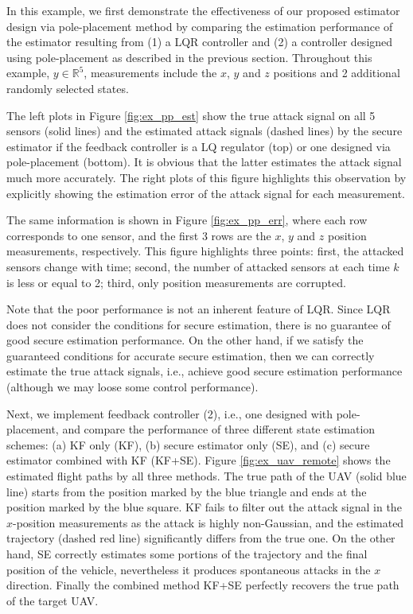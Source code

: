\documentclass[../../thesis.tex]{subfiles}
\begin{document}
In this example, we first demonstrate the effectiveness of our proposed estimator design via pole-placement method by comparing the estimation performance of the estimator resulting from (1) a LQR controller and (2) a controller designed using pole-placement as described in the previous section.
Throughout this example, $y \in \mathbb{R}^5$, measurements include the $x$, $y$ and $z$ positions and 2 additional randomly selected states. 

The left plots in Figure \ref{fig:ex_pp_est} show the true attack signal on all 5 sensors (solid lines) and the estimated attack signals (dashed lines) by the secure estimator if the feedback controller is a LQ regulator (top) or one designed via pole-placement (bottom). It is obvious that the latter estimates the attack signal much more accurately. The right plots of this figure highlights this observation by explicitly showing the estimation error of the attack signal for each measurement.

The same information is shown in Figure \ref{fig:ex_pp_err}, where each row corresponds to one sensor, and the first 3 rows are the $x$, $y$ and $z$ position measurements, respectively. This figure highlights three points: first, the attacked sensors change with time; second, the number of attacked sensors at each time $k$ is less or equal to 2; third, only position measurements are corrupted.

 
Note that the poor performance is not an inherent feature of LQR. 
Since LQR does not consider the conditions for secure estimation, there is no guarantee of good secure estimation performance. %
On the other hand, if we satisfy the guaranteed conditions for accurate secure estimation, then we can correctly estimate the true attack signals, i.e., achieve good secure estimation performance (although we may loose some control performance).

Next, we implement feedback controller (2), i.e., one designed with pole-placement, and compare the performance of three different state estimation schemes: (a) KF only (KF), (b) secure estimator only (SE), and (c) secure estimator combined with KF (KF+SE). 
Figure \ref{fig:ex_uav_remote} shows the estimated flight paths by all three methods.
The true path of the UAV (solid blue line) starts from the position marked by the blue triangle and ends at the position marked by the blue square. KF fails to filter out the attack signal in the $x$-position measurements as the attack is highly non-Gaussian, and the estimated trajectory (dashed red line) significantly differs from the true one. On the other hand, SE correctly estimates some portions of the trajectory and the final position of the vehicle, nevertheless it produces spontaneous attacks in the $x$ direction. 
Finally the combined method KF+SE perfectly recovers the true path of the target UAV.
\end{document}
